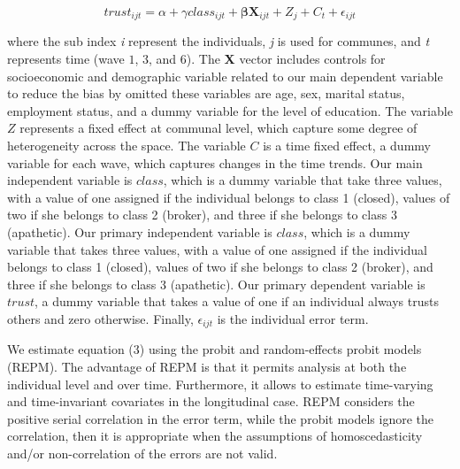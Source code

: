 \begin{equation}
trust_{ijt} = \alpha + \gamma class_{ijt} + \boldsymbol{\beta} \mathbf{X}_{ijt} + Z_{j} + C_{t} + \epsilon_{ijt}
\end{equation}

where the sub index \textit{i} represent the individuals, \textit{j} is used for communes, and \textit{t} represents time (wave $1$, $3$, and $6$). The \textbf{X} vector includes controls for socioeconomic and demographic variable related to our main dependent variable to reduce the bias by omitted these variables are age, sex, marital status, employment status, and a dummy variable for the level of education. The variable $Z$ represents a fixed effect at communal level, which capture some degree of heterogeneity across the space. The variable $C$ is a time fixed effect, a dummy variable for each wave, which captures changes in the time trends. Our main independent variable is $class$, which is a dummy variable that take three values, with a value of one assigned if the individual belongs to class 1 (closed), values of two if she belongs to class 2 (broker), and three if she belongs to class 3 (apathetic). Our primary independent variable is $class$, which is a dummy variable that takes three values, with a value of one assigned if the individual belongs to class 1 (closed), values of two if she belongs to class 2 (broker), and three if she belongs to class 3 (apathetic). Our primary dependent variable is $trust$, a dummy variable that takes a value of one if an individual always trusts others and zero otherwise. Finally, $\epsilon_{ijt}$ is the individual error term.

\hfill

We estimate equation (3) using the probit and random-effects probit models (REPM). The advantage of REPM is that it permits analysis at both the individual level and over time. Furthermore, it allows to estimate time-varying and time-invariant covariates in the longitudinal case. REPM considers the positive serial correlation in the error term, while the probit models ignore the correlation, then it is appropriate when the assumptions of homoscedasticity and/or non-correlation of the errors are not valid.

\hfill

